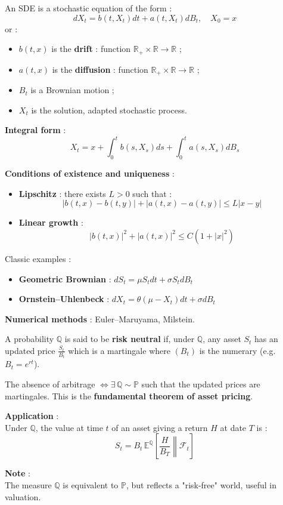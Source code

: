 \begin{f}
	
	An SDE is a stochastic equation of the form :
	\[
	dX_t = b(t, X_t) dt + a(t, X_t) dB_t, \quad X_0 = x
	\]
	or :
	\begin{itemize}
		\item \(b(t,x)\) is the \textbf{drift} : function \(\mathbb{R}_+ \times \mathbb{R} \to \mathbb{R}\) ;
		\item \(a(t,x)\) is the \textbf{diffusion} : function \(\mathbb{R}_+ \times \mathbb{R} \to \mathbb{R}\) ;
		\item \(B_t\) is a Brownian motion ;
		\item \(X_t\) is the solution, adapted stochastic process.
	\end{itemize}
	
	\textbf{Integral form} :
	\[
	X_t = x + \int_0^t b(s, X_s) ds + \int_0^t a(s, X_s) dB_s
	\]
	
	\textbf{Conditions of existence and uniqueness} :
	\begin{itemize}
		\item \textbf{Lipschitz} : there exists \(L > 0\) such that :
		\[
		|b(t,x) - b(t,y)| + |a(t,x) - a(t,y)| \leq L |x - y|
		\]
		\item \textbf{Linear growth} :
		\[
		|b(t,x)|^2 + |a(t,x)|^2 \leq C(1 + |x|^2)
		\]
	\end{itemize}
	
Classic examples :
	\begin{itemize}
		\item \textbf{Geometric Brownian} : \(dS_t = \mu S_t dt + \sigma S_t dB_t\)
		\item \textbf{Ornstein–Uhlenbeck} : \(dX_t = \theta(\mu - X_t) dt + \sigma dB_t\)
	\end{itemize}
	
	\textbf{Numerical methods} : Euler–Maruyama, Milstein.
	
\end{f}

\begin{f}
	
	A probability \(\mathbb{Q}\) is said to be \textbf{risk neutral} if, under \(\mathbb{Q}\), 
	any asset \(S_t\) has an updated price \( \frac{S_t}{B_t}\) which is a martingale
	where \((B_t)\) is the numerary (e.g. \(B_t = e^{rt}\)).
	
	The absence of arbitrage \(\iff \exists\, \mathbb{Q} \sim \mathbb{P}\) such that the updated prices are martingales.
	This is the \textbf{fundamental theorem of asset pricing}.
	
	\textbf{Application} :\\
	Under \(\mathbb{Q}\), the value at time \(t\) of an asset giving a return \(H\) at date \(T\) is :
	\[
	S_t = B_t\, \mathbb{E}^\mathbb{Q} \left[ \left. \frac{H}{B_T} \right\|  \mathcal{F}_t \right]
	\]
	
	\textbf{Note} :\\
	The measure \(\mathbb{Q}\) is equivalent to \(\mathbb{P}\), but reflects a "risk-free" world, useful in valuation.
	
\end{f}
\newcolumn

